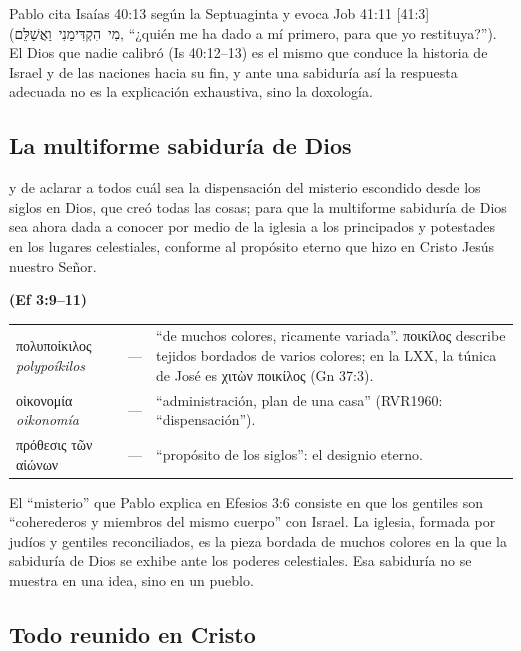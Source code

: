 \documentclass[11pt,letterpaper]{article}
\newcommand{\heb}[1]{\mbox{\foreignlanguage{hebrew}{#1}}}
\newcommand{\grc}[1]{\foreignlanguage{ancientgreek}{#1}}
\newcommand{\fuente}[1]{\par\hfill{\upshape\bfseries\small\textcolor{azul}{#1}}}
\begin{document}
Pablo cita Isaías 40:13 según la Septuaginta y evoca Job 41:11 [41:3] (\heb{מִי הִקְדִּימַנִי וַאֲשַׁלֵּם}, ``¿quién me ha dado a mí primero, para que yo restituya?''). El Dios que nadie calibró (Is 40:12--13) es el mismo que conduce la historia de Israel y de las naciones hacia su fin, y ante una sabiduría así la respuesta adecuada no es la explicación exhaustiva, sino la doxología.

\subsection{La multiforme sabiduría de Dios}

\begin{cita}y de aclarar a todos cuál sea la dispensación del misterio escondido desde los siglos en Dios, que creó todas las cosas; para que la multiforme sabiduría de Dios sea ahora dada a conocer por medio de la iglesia a los principados y potestades en los lugares celestiales, conforme al propósito eterno que hizo en Cristo Jesús nuestro Señor.\fuente{(Ef 3:9--11)}\end{cita}

\begin{filologia}[Ef 3:10]
\begin{tabular}{@{}L{3.2cm}L{1.6cm}L{10cm}@{}}
\grc{πολυποίκιλος} \emph{polypoíkilos} & --- & ``de muchos colores, ricamente variada''. \grc{ποικίλος} describe tejidos bordados de varios colores; en la LXX, la túnica de José es \grc{χιτὼν ποικίλος} (Gn 37:3). \\[2pt]
\grc{οἰκονομία} \emph{oikonomía} & --- & ``administración, plan de una casa'' (RVR1960: ``dispensación''). \\[2pt]
\grc{πρόθεσις τῶν αἰώνων} & --- & ``propósito de los siglos'': el designio eterno. \\
\end{tabular}
\end{filologia}

El ``misterio'' que Pablo explica en Efesios 3:6 consiste en que los gentiles son ``coherederos y miembros del mismo cuerpo'' con Israel. La iglesia, formada por judíos y gentiles reconciliados, es la pieza bordada de muchos colores en la que la sabiduría de Dios se exhibe ante los poderes celestiales. Esa sabiduría no se muestra en una idea, sino en un pueblo.

\subsection{Todo reunido en Cristo}
\end{document}
